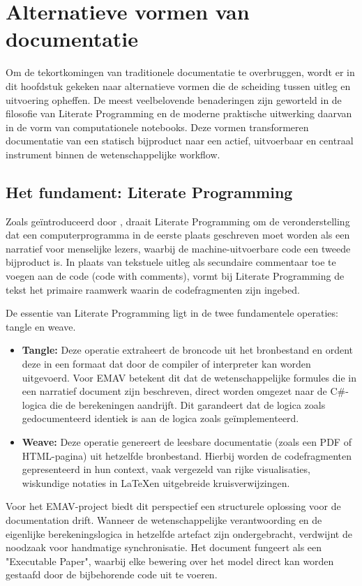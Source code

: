 \chapter{Alternatieve vormen van documentatie}
\label{ch:documentatie_vormen}

Om de tekortkomingen van traditionele documentatie te overbruggen, wordt er in dit hoofdstuk gekeken naar alternatieve vormen die de scheiding tussen uitleg en uitvoering opheffen. De meest veelbelovende benaderingen zijn geworteld in de filosofie van Literate Programming en de moderne praktische uitwerking daarvan in de vorm van computationele notebooks. Deze vormen transformeren documentatie van een statisch bijproduct naar een actief, uitvoerbaar en centraal instrument binnen de wetenschappelijke workflow.

\section{Het fundament: Literate Programming}
Zoals ge\"introduceerd door \textcite{Knuth1984}, draait Literate Programming om de veronderstelling dat een computerprogramma in de eerste plaats geschreven moet worden als een narratief voor menselijke lezers, waarbij de machine-uitvoerbare code een tweede bijproduct is. In plaats van tekstuele uitleg als secundaire commentaar toe te voegen aan de code (code with comments), vormt bij Literate Programming de tekst het primaire raamwerk waarin de codefragmenten zijn ingebed.

De essentie van Literate Programming ligt in de twee fundamentele operaties: tangle en weave. 
\begin{itemize}
    \item \textbf{Tangle:} Deze operatie extraheert de broncode uit het bronbestand en ordent deze in een formaat dat door de compiler of interpreter kan worden uitgevoerd. Voor EMAV betekent dit dat de wetenschappelijke formules die in een narratief document zijn beschreven, direct worden omgezet naar de C\#-logica die de berekeningen aandrijft. Dit garandeert dat de logica zoals gedocumenteerd identiek is aan de logica zoals ge\"implementeerd.
    \item \textbf{Weave:} Deze operatie genereert de leesbare documentatie (zoals een PDF of HTML-pagina) uit hetzelfde bronbestand. Hierbij worden de codefragmenten gepresenteerd in hun context, vaak vergezeld van rijke visualisaties, wiskundige notaties in \LaTeX en uitgebreide kruisverwijzingen.
\end{itemize}
Voor het EMAV-project biedt dit perspectief een structurele oplossing voor de documentation drift. Wanneer de wetenschappelijke verantwoording en de eigenlijke berekeningslogica in hetzelfde artefact zijn ondergebracht, verdwijnt de noodzaak voor handmatige synchronisatie. Het document fungeert als een "Executable Paper", waarbij elke bewering over het model direct kan worden gestaafd door de bijbehorende code uit te voeren.


